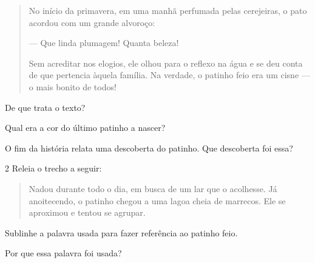 \begin{quote}
No início da primavera, em uma manhã perfumada pelas cerejeiras, o pato
acordou com um grande alvoroço:

--- Que linda plumagem! Quanta beleza!

Sem acreditar nos elogios, ele olhou para o reflexo na água e se deu
conta de que pertencia àquela família. Na verdade, o patinho feio era um
cisne --- o mais bonito de todos!

\end{quote}

\begin{escolha}
\item De que trata o texto?


\item Qual era a cor do último patinho a nascer?


\item O fim da história relata uma descoberta do patinho. Que descoberta
foi essa?

\end{escolha}

\num{2} Releia o trecho a seguir:

\begin{quote}
Nadou durante todo o dia, em busca de um lar que o acolhesse. Já
anoitecendo, o patinho chegou a uma lagoa cheia de marrecos. Ele
se aproximou e tentou se agrupar.
\end{quote}

\begin{escolha}
\item Sublinhe a palavra usada para fazer referência ao patinho feio.


\item Por que essa palavra foi usada?

\end{escolha}

